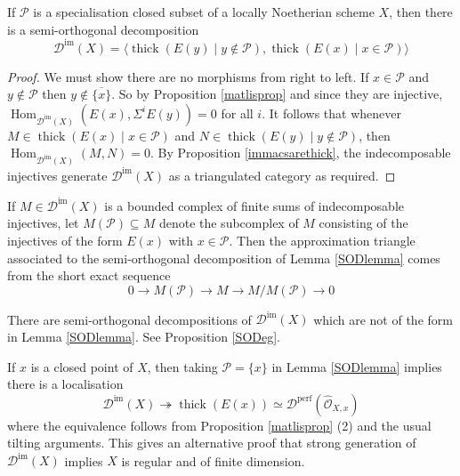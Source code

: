 \documentclass[12pt,oneside]{amsart}
\DeclareMathOperator{\im}{im}
\DeclareMathOperator{\Hom}{Hom}
\DeclareMathOperator{\thick}{thick}
\DeclareMathOperator{\perf}{perf}
\DeclareMathOperator{\immac}{im}
\begin{document}
\begin{lemma} \label{SODlemma}
If $\mathcal{P}$ is a specialisation closed subset of a locally Noetherian scheme $X$, then there is a semi-orthogonal decomposition
\[
\mathcal{D}^{\immac}(X) = \langle \thick(E(y) \mid y \not\in \mathcal{P}), \thick(E(x) \mid x \in \mathcal{P}) \rangle
\]
\end{lemma}

\begin{proof}
We must show there are no morphisms from right to left. If $x \in \mathcal{P}$ and $y \not\in \mathcal{P}$ then $y \not\in \overline{\{x\}}$. So by Proposition \ref{matlisprop} and since they are injective, $\Hom_{\mathcal{D}^{\immac}(X)}(E(x),\Sigma^i E(y)) = 0$ for all $i$. It follows that whenever $M \in \thick(E(x) \mid x \in \mathcal{P})$ and $N \in \thick(E(y) \mid y \notin \mathcal{P})$, then $\Hom_{\mathcal{D}^{\immac}(X)}(M,N) = 0$. By Proposition \ref{immacsarethick}, the indecomposable injectives generate $\mathcal{D}^{\im}(X)$ as a triangulated category as required. 
\end{proof}

\begin{remark} \label{explicitapprox}
If $M \in \mathcal{D}^{\immac}(X)$ is a bounded complex of finite sums of indecomposable injectives, let $M(\mathcal{P}) \subseteq M$ denote the subcomplex of $M$ consisting of the injectives of the form $E(x)$ with $x \in \mathcal{P}$. Then the approximation triangle associated to the semi-orthogonal decomposition of Lemma \ref{SODlemma} comes from the short exact sequence
\[
0 \to M(\mathcal{P}) \to M \to M/M(\mathcal{P}) \to 0
\]
\end{remark}


\begin{remark}
There are semi-orthogonal decompositions of $\mathcal{D}^{\immac}(X)$ which are not of the form in Lemma \ref{SODlemma}. See Proposition \ref{SODeg}.
\end{remark}

\begin{remark} \label{closedlocalisation}
If $x$ is a closed point of $X$, then taking $\mathcal{P} = \{x\}$ in Lemma \ref{SODlemma} implies there is a localisation 
\[
\mathcal{D}^{\immac}(X) \twoheadrightarrow \thick(E(x)) \simeq \mathcal{D}^{\perf}(\widehat{\mathcal{O}}_{X,x})
\]
where the equivalence follows from Proposition \ref{matlisprop} (2) and the usual tilting arguments. This gives an alternative proof that strong generation of $\mathcal{D}^{\immac}(X)$ implies $X$ is regular and of finite dimension. 
\end{remark}
\end{document}
